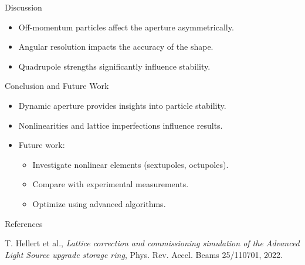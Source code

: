 \documentclass{beamer}
\begin{document}
\begin{frame}{Discussion}
    \begin{itemize}
        \item Off-momentum particles affect the aperture asymmetrically.
        \item Angular resolution impacts the accuracy of the shape.
        \item Quadrupole strengths significantly influence stability.
    \end{itemize}
\end{frame}

\begin{frame}{Conclusion and Future Work}
    \begin{itemize}
        \item Dynamic aperture provides insights into particle stability.
        \item Nonlinearities and lattice imperfections influence results.
        \item Future work:
        \begin{itemize}
            \item Investigate nonlinear elements (sextupoles, octupoles).
            \item Compare with experimental measurements.
            \item Optimize using advanced algorithms.
        \end{itemize}
    \end{itemize}
\end{frame}

\begin{frame}{References}
    \begin{thebibliography}{10}
        \beamertemplatetextbibitems
        T. Hellert et al., \textit{Lattice correction and commissioning simulation of the Advanced Light Source upgrade storage ring}, Phys. Rev. Accel. Beams 25/110701, 2022.
    \end{thebibliography}
\end{frame}
\end{document}
